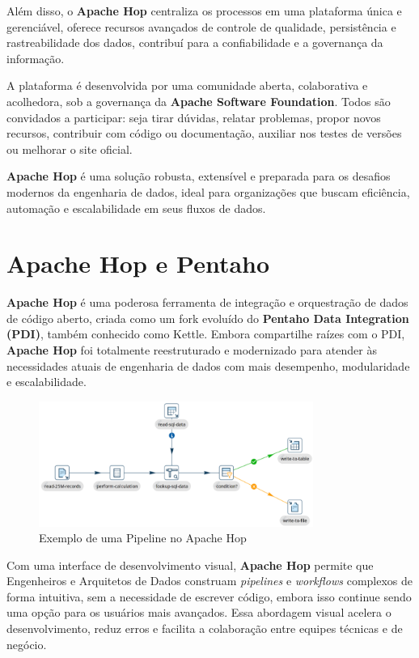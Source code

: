 \documentclass[a4paper,11pt]{article}
\begin{document}
Além disso, o \textbf{Apache Hop} centraliza os processos em uma plataforma única e gerenciável, oferece recursos avançados de controle de qualidade, persistência e rastreabilidade dos dados, contribuí para a confiabilidade e a governança da informação.

A plataforma é desenvolvida por uma comunidade aberta, colaborativa e acolhedora, sob a governança da \textbf{Apache Software Foundation}. Todos são convidados a participar: seja tirar dúvidas, relatar problemas, propor novos recursos, contribuir com código ou documentação, auxiliar nos testes de versões ou melhorar o site oficial.

\textbf{Apache Hop} é uma solução robusta, extensível e preparada para os desafios modernos da engenharia de dados, ideal para organizações que buscam eficiência, automação e escalabilidade em seus fluxos de dados.

\section{Apache Hop e Pentaho}
\textbf{Apache Hop} é uma poderosa ferramenta de integração e orquestração de dados de código aberto, criada como um fork evoluído do \textbf{Pentaho Data Integration (PDI)}, também conhecido como Kettle. Embora compartilhe raízes com o PDI, \textbf{Apache Hop} foi totalmente reestruturado e modernizado para atender às necessidades atuais de engenharia de dados com mais desempenho, modularidade e escalabilidade.

\begin{figure}[!htb]
	\centering
	\includegraphics[width=0.8\textwidth]{imagens/Pipeline}
	\caption{Exemplo de uma Pipeline no Apache Hop}
\end{figure}

Com uma interface de desenvolvimento visual, \textbf{Apache Hop} permite que Engenheiros e Arquitetos de Dados construam \textit{pipelines} e \textit{workflows} complexos de forma intuitiva, sem a necessidade de escrever código, embora isso continue sendo uma opção para os usuários mais avançados. Essa abordagem visual acelera o desenvolvimento, reduz erros e facilita a colaboração entre equipes técnicas e de negócio.
\end{document}
